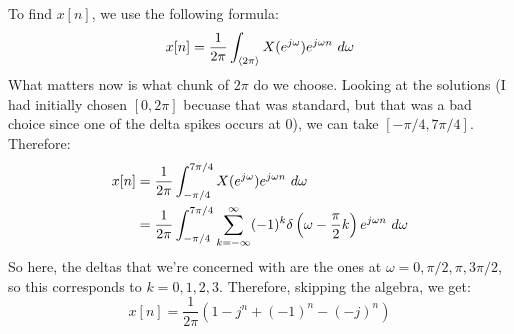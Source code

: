 \documentclass[10pt]{article}
\begin{document}
\begin{enumerate}[label=\alph*)]
			\begin{solution}
				To find \( x[n] \), we use the following formula:
				\[
					x[n] = \frac{1}{2\pi}\int_{\langle 2\pi \rangle} X(e^{ j \omega})e^{ j \omega n}\ d \omega
				\] 
				What matters now is what chunk of \( 2\pi \) do we choose. Looking at the solutions (I had initially 
				chosen \( [0, 2\pi] \) becuase that was standard, but that was a bad choice since one of the 
				delta spikes occurs at 0), we can take 
				\( [-\pi / 4, 7 \pi /4] \). Therefore:
				\begin{align*}
					x[n] &= \frac{1}{2\pi}\int_{-\pi / 4}^{7 \pi / 4} X(e^{j \omega}) e^{j \omega n} \ d \omega\\
					&= \frac{1}{2\pi}\int_{- \pi / 4}^{7 \pi / 4} \sum_{k=-\infty}^{\infty} (-1)^{k}
					\delta\left( \omega - \frac{\pi}{2}k \right) e^{ j \omega n}\ d  \omega
				\end{align*}
				So here, the deltas that we're concerned with are the ones at 
				\( \omega = 0, \pi / 2, \pi, 3 \pi / 2 \), so this corresponds to \( k = 0, 1, 2, 3 \). 
				Therefore, skipping the algebra, we get:
				\[
					x[n] = \frac{1}{2\pi}(1 - j^{n} + (-1)^{n} - (-j)^{n})
				\] 
			\end{solution}
	\end{enumerate}
	\pagebreak
\end{document}
